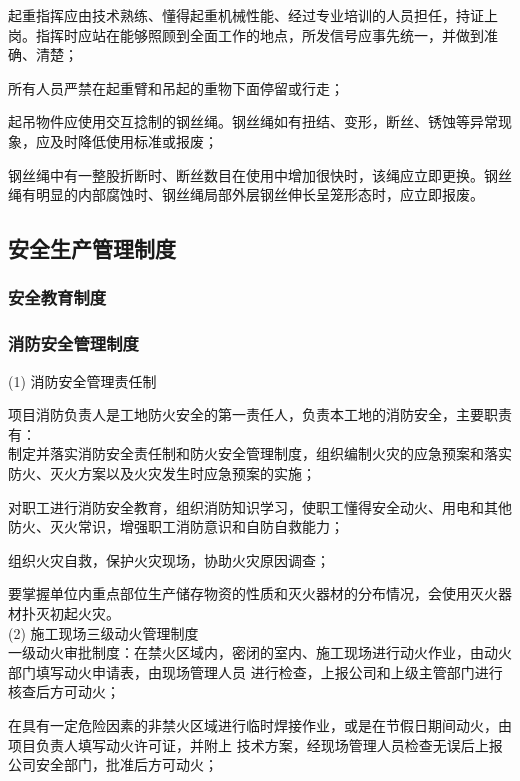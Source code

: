 起重指挥应由技术熟练、懂得起重机械性能、经过专业培训的人员担任，持证上岗。指挥时应站在能够照顾到全面工作的地点，所发信号应事先统一，并做到准确、清楚；

 所有人员严禁在起重臂和吊起的重物下面停留或行走；

 起吊物件应使用交互捻制的钢丝绳。钢丝绳如有扭结、变形，断丝、锈蚀等异常现象，应及时降低使用标准或报废；

 钢丝绳中有一整股折断时、断丝数目在使用中增加很快时，该绳应立即更换。钢丝绳有明显的内部腐蚀时、钢丝绳局部外层钢丝伸长呈笼形态时，应立即报废。\\

\subsection{安全生产管理制度}
\subsubsection{安全教育制度}

\subsubsection{消防安全管理制度}

(1) 消防安全管理责任制

项目消防负责人是工地防火安全的第一责任人，负责本工地的消防安全，主要职责有：\\

 制定并落实消防安全责任制和防火安全管理制度，组织编制火灾的应急预案和落实防火、灭火方案以及火灾发生时应急预案的实施；

 对职工进行消防安全教育，组织消防知识学习，使职工懂得安全动火、用电和其他防火、灭火常识，增强职工消防意识和自防自救能力；

 组织火灾自救，保护火灾现场，协助火灾原因调查；

 要掌握单位内重点部位生产储存物资的性质和灭火器材的分布情况，会使用灭火器材扑灭初起火灾。\\

(2) 施工现场三级动火管理制度\\

 一级动火审批制度：在禁火区域内，密闭的室内、施工现场进行动火作业，由动火部门填写动火申请表，由现场管理人员
进行检查，上报公司和上级主管部门进行核查后方可动火；

 在具有一定危险因素的非禁火区域进行临时焊接作业，或是在节假日期间动火，由项目负责人填写动火许可证，并附上
技术方案，经现场管理人员检查无误后上报公司安全部门，批准后方可动火；

